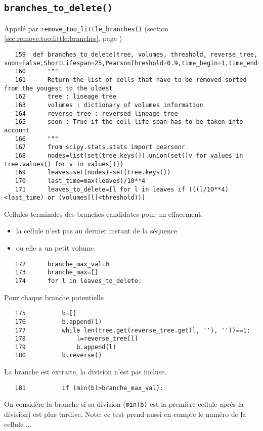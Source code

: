 \documentclass{article}
\def \mycolor {red}
\begin{document}
\subsection{\texttt{branches\_to\_delete()}}
\label{sec:branches:to:delete}
\color{\mycolor}
Appel\'e par \texttt{remove\_too\_little\_branches()}
(section \ref{sec:remove:too:little:branches}, page \pageref{sec:remove:too:little:branches})
\color{black}
\begin{verbatim} 
   159	def branches_to_delete(tree, volumes, threshold, reverse_tree, soon=False,ShortLifespan=25,PearsonThreshold=0.9,time_begin=1,time_end=192):
   160	    """
   161	    Return the list of cells that have to be removed sorted from the yougest to the oldest
   162	    tree : lineage tree
   163	    volumes : dictionary of volumes information
   164	    reverse_tree : reversed lineage tree
   165	    soon : True if the cell life span has to be taken into account
   166	    """
   167	    from scipy.stats.stats import pearsonr
   168	    nodes=list(set(tree.keys()).union(set([v for values in tree.values() for v in values])))
   169	    leaves=set(nodes)-set(tree.keys())
   170	    last_time=max(leaves)/10**4
   171	    leaves_to_delete=[l for l in leaves if (((l/10**4)<last_time) or (volumes[l]<threshold))]
\end{verbatim} 
\color{\mycolor}
Cellules terminales des branches candidates pour un effacement.
\begin{itemize}
\item la cellule n'est pas au dernier instant de la s\'equence
\item ou elle a un petit volume
\end{itemize}
\color{black}
\begin{verbatim}
   172	    branche_max_val=0
   173	    branche_max=[]
   174	    for l in leaves_to_delete:
\end{verbatim} 
\color{\mycolor}
Pour chaque branche potentielle
\color{black}
\begin{verbatim}
   175	        b=[]
   176	        b.append(l)
   177	        while len(tree.get(reverse_tree.get(l, ''), ''))==1:
   178	            l=reverse_tree[l]
   179	            b.append(l)
   180	        b.reverse()
\end{verbatim} 
\color{\mycolor}
La branche est extraite, la division n'est pas incluse.
\color{black}
\begin{verbatim}
   181	        if (min(b)>branche_max_val):
\end{verbatim} 
\color{\mycolor}
On consid\`ere la branche si sa division (\verb|min(b)| est la premi\`ere cellule apr\`es la division) est plus tardive. Note: ce test prend aussi en compte le num\'ero de la cellule ...
\end{document}
